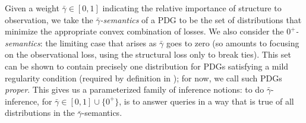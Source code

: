 \documentclass{article}
\newcommand\zogamma{{\bar\gamma}}
\begin{document}
%
Given a weight $\zogamma
\in [0,1]
$
indicating the relative importance of structure to observation,
we take the \emph{$\zogamma$-semantics} of a PDG to be the
set of distributions that minimize 
the appropriate convex combination of losses.
We also consider the \emph{$0^+$\!-semantics}: the limiting case that
arises as $\zogamma$ goes to zero
(so amounts to focusing on the observational loss, using the structural loss only to break ties).
This set
can be shown to contain precisely one distribution
for PDGs satisfying a mild regularity condition 
(required by definition in \citeauthor{pdg-aaai});
for now, we call such PDGs \emph{proper}.
This gives us a parameterized family of inference notions:
to do $\zogamma$-inference, for $\zogamma \in [0,1] \cup \{0^+\}$,
is to answer queries in a way that is true of all distributions in the $\zogamma$-semantics.
\end{document}
